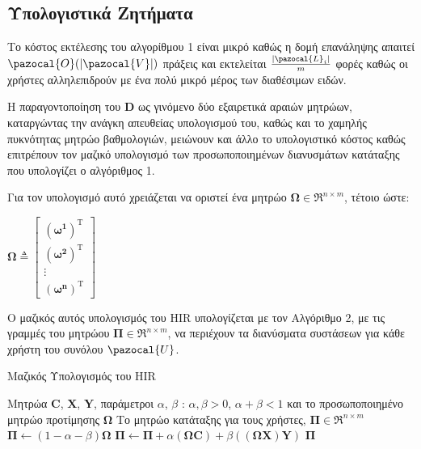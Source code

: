 \subsection{Υπολογιστικά Ζητήματα}
Το κόστος εκτέλεσης του αλγορίθμου 1 είναι μικρό καθώς η δομή επανάληψης απαιτεί $\pazocal{O}(|\pazocal{V}|)$ πράξεις και εκτελείται $\frac{|\pazocal{L}_i|}{m}$ φορές καθώς οι χρήστες αλληλεπιδρούν με ένα πολύ μικρό μέρος των διαθέσιμων ειδών.\par
Η παραγοντοποίηση του $\mathbf{D}$ ως γινόμενο δύο εξαιρετικά αραιών μητρώων, καταργώντας την ανάγκη απευθείας υπολογισμού του, καθώς και το χαμηλής πυκνότητας μητρώο βαθμολογιών, μειώνουν και άλλο το υπολογιστικό κόστος καθώς επιτρέπουν τον μαζικό υπολογισμό των προσωποποιημένων διανυσμάτων κατάταξης που υπολογίζει ο αλγόριθμος 1. \par
Για τον υπολογισμό αυτό χρειάζεται να οριστεί ένα μητρώο $\boldsymbol{\Omega}\in\Re^{n\times m}$, τέτοιο ώστε: 
\begin{center}
$\boldsymbol{\Omega} \triangleq \left[     
\begin{array}{c}
\boldsymbol{(\omega^1)}^\text{T} \\
\boldsymbol{(\omega^2)}^\text{T} \\
\vdots \\ 
\boldsymbol{(\omega^n)}^\text{T}
\end{array}\right]$ 
\end{center}\par
Ο μαζικός αυτός υπολογισμός του {\en HIR} υπολογίζεται με τον Αλγόριθμο 2, με τις γραμμές του μητρώου $\boldsymbol{\Pi}\in \Re^{n\times m}$, να περιέχουν τα διανύσματα συστάσεων για κάθε χρήστη του συνόλου $\pazocal{U}$.
\begin{algorithm}[ht]
  \caption{Μαζικός Υπολογισμός του {\en HIR}}\label{}
  \begin{algorithmic}[1]
    \Require Μητρώα $\mathbf{C}$, $\mathbf{X}$, $\mathbf{Y}$, παράμετροι $\alpha$, $\beta$ : $\alpha, \beta > 0$, $\alpha + \beta < 1$ και το προσωποποιημένο μητρώο προτίμησης $\boldsymbol{\Omega}$
    \Ensure Το μητρώο κατάταξης για τους χρήστες, $\boldsymbol{\Pi}\in \Re^{n\times m}$
    \medskip
    \State $\boldsymbol{\Pi} \gets (1-\alpha - \beta)\boldsymbol{\Omega}$
    \State $\boldsymbol{\Pi} \gets \boldsymbol{\Pi} + \alpha(\boldsymbol{\Omega}\mathbf{C}) + \beta((\boldsymbol{\Omega}\mathbf{X})\mathbf{Y})$
    \State \Return $ \boldsymbol{\Pi} $
  \end{algorithmic}
\end{algorithm}
